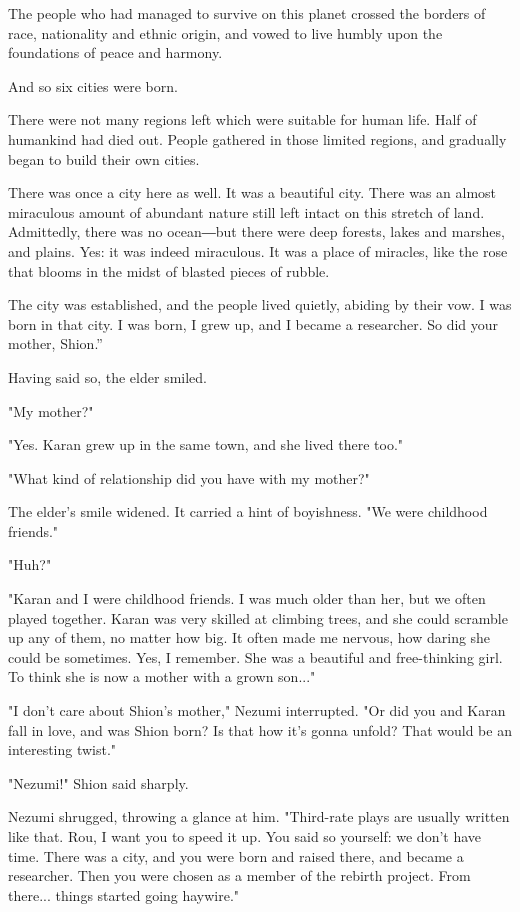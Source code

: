 The people who had managed to survive on this planet crossed the borders
of race, nationality and ethnic origin, and vowed to live humbly upon
the foundations of peace and harmony.

And so six cities were born.

There were not many regions left which were suitable for human life.
Half of humankind had died out. People gathered in those limited
regions, and gradually began to build their own cities.

There was once a city here as well. It was a beautiful city. There was
an almost miraculous amount of abundant nature still left intact on this
stretch of land. Admittedly, there was no ocean―but there were deep
forests, lakes and marshes, and plains. Yes: it was indeed miraculous.
It was a place of miracles, like the rose that blooms in the midst of
blasted pieces of rubble.

The city was established, and the people lived quietly, abiding by their
vow. I was born in that city. I was born, I grew up, and I became a
researcher. So did your mother, Shion.''

Having said so, the elder smiled.

"My mother?"

"Yes. Karan grew up in the same town, and she lived there too."

"What kind of relationship did you have with my mother?"

The elder's smile widened. It carried a hint of boyishness. "We were
childhood friends."

"Huh?"

"Karan and I were childhood friends. I was much older than her, but we
often played together. Karan was very skilled at climbing trees, and she
could scramble up any of them, no matter how big. It often made me
nervous, how daring she could be sometimes. Yes, I remember. She was a
beautiful and free-thinking girl. To think she is now a mother with a
grown son..."

"I don't care about Shion's mother," Nezumi interrupted. "Or did you and
Karan fall in love, and was Shion born? Is that how it's gonna unfold?
That would be an interesting twist."

"Nezumi!" Shion said sharply.

Nezumi shrugged, throwing a glance at him. "Third-rate plays are usually
written like that. Rou, I want you to speed it up. You said so yourself:
we don't have time. There was a city, and you were born and raised
there, and became a researcher. Then you were chosen as a member of the
rebirth project. From there... things started going haywire."

